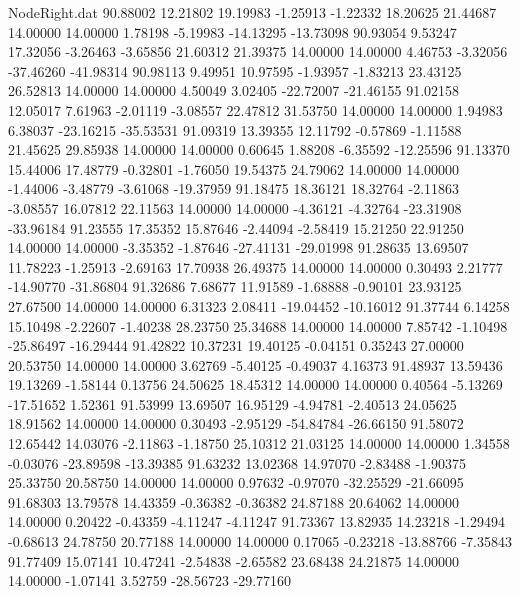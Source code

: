 \begin{filecontents}{NodeRight.dat}
  90.88002   12.21802   19.19983    -1.25913   -1.22332   18.20625   21.44687   14.00000   14.00000    1.78198   -5.19983  -14.13295  -13.73098
  90.93054    9.53247   17.32056    -3.26463   -3.65856   21.60312   21.39375   14.00000   14.00000    4.46753   -3.32056  -37.46260  -41.98314
  90.98113    9.49951   10.97595    -1.93957   -1.83213   23.43125   26.52813   14.00000   14.00000    4.50049    3.02405  -22.72007  -21.46155
  91.02158   12.05017    7.61963    -2.01119   -3.08557   22.47812   31.53750   14.00000   14.00000    1.94983    6.38037  -23.16215  -35.53531
  91.09319   13.39355   12.11792    -0.57869   -1.11588   21.45625   29.85938   14.00000   14.00000    0.60645    1.88208   -6.35592  -12.25596
  91.13370   15.44006   17.48779    -0.32801   -1.76050   19.54375   24.79062   14.00000   14.00000   -1.44006   -3.48779   -3.61068  -19.37959
  91.18475   18.36121   18.32764    -2.11863   -3.08557   16.07812   22.11563   14.00000   14.00000   -4.36121   -4.32764  -23.31908  -33.96184
  91.23555   17.35352   15.87646    -2.44094   -2.58419   15.21250   22.91250   14.00000   14.00000   -3.35352   -1.87646  -27.41131  -29.01998
  91.28635   13.69507   11.78223    -1.25913   -2.69163   17.70938   26.49375   14.00000   14.00000    0.30493    2.21777  -14.90770  -31.86804
  91.32686    7.68677   11.91589    -1.68888   -0.90101   23.93125   27.67500   14.00000   14.00000    6.31323    2.08411  -19.04452  -10.16012
  91.37744    6.14258   15.10498    -2.22607   -1.40238   28.23750   25.34688   14.00000   14.00000    7.85742   -1.10498  -25.86497  -16.29444
  91.42822   10.37231   19.40125    -0.04151    0.35243   27.00000   20.53750   14.00000   14.00000    3.62769   -5.40125   -0.49037    4.16373
  91.48937   13.59436   19.13269    -1.58144    0.13756   24.50625   18.45312   14.00000   14.00000    0.40564   -5.13269  -17.51652    1.52361
  91.53999   13.69507   16.95129    -4.94781   -2.40513   24.05625   18.91562   14.00000   14.00000    0.30493   -2.95129  -54.84784  -26.66150
  91.58072   12.65442   14.03076    -2.11863   -1.18750   25.10312   21.03125   14.00000   14.00000    1.34558   -0.03076  -23.89598  -13.39385
  91.63232   13.02368   14.97070    -2.83488   -1.90375   25.33750   20.58750   14.00000   14.00000    0.97632   -0.97070  -32.25529  -21.66095
  91.68303   13.79578   14.43359    -0.36382   -0.36382   24.87188   20.64062   14.00000   14.00000    0.20422   -0.43359   -4.11247   -4.11247
  91.73367   13.82935   14.23218    -1.29494   -0.68613   24.78750   20.77188   14.00000   14.00000    0.17065   -0.23218  -13.88766   -7.35843
  91.77409   15.07141   10.47241    -2.54838   -2.65582   23.68438   24.21875   14.00000   14.00000   -1.07141    3.52759  -28.56723  -29.77160

\end{filecontents}

